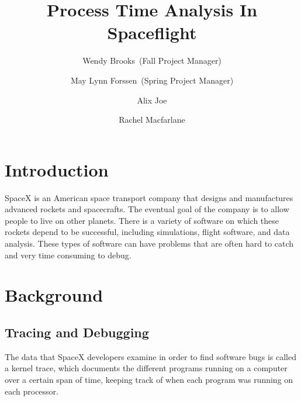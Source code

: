 \documentclass[midyear]{hmcclinic}
\title{Process Time Analysis In Spaceflight}
\author{Wendy Brooks~(Fall Project Manager) \and May Lynn Forssen~(Spring Project Manager) \and Alix Joe \and
Rachel Macfarlane}
\begin{document}

\maketitle




\section{Introduction} %
SpaceX is an American space transport company that designs and manufactures
advanced rockets and spacecrafts. The eventual goal of the company is to allow people to live on other planets. There is a variety of software on which these rockets depend to be successful, including simulations, flight software, and data analysis. These types of software can have problems that are often hard to catch and very time consuming to debug.

\section{Background} %
\subsection{Tracing and Debugging}
The data that SpaceX developers examine in order to find software bugs is called a kernel trace, which documents the different programs running on a computer over a certain span of time, keeping track of when each program was running on each processor. 
\end{document}
